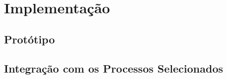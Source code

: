 \chapter{Implementação}
\label{chap:implementacao}

\section{Protótipo}
\label{sec:implementacao_prototipo}

\section{Integração com os Processos Selecionados}
\label{sec:implementacao_integracao}
